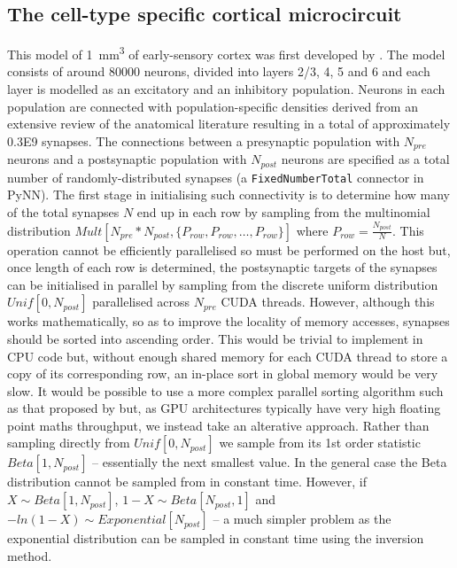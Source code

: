\documentclass[utf8]{frontiersSCNS} %
\begin{document}
\subsection{The cell-type specific cortical microcircuit}
\label{sec:method/microcircuit}
This model of \SI{1}{\milli\metre\cubed} of early-sensory cortex was first developed by \citet{Potjans2012}.
The model consists of around \num{80000} neurons, divided into layers 2/3, 4, 5 and 6 and each layer is modelled as an excitatory and an inhibitory population.
Neurons in each population are connected with population-specific densities derived from an extensive review of the anatomical literature resulting in a total of approximately \num{0.3E9} synapses.
The connections between a presynaptic population with $N_{pre}$ neurons and a postsynaptic population with $N_{post}$ neurons are specified as a total number of randomly-distributed synapses (a \lstinline{FixedNumberTotal} connector in PyNN).
The first stage in initialising such connectivity is to determine how many of the total synapses $N$ end up in each row by sampling from the multinomial distribution $Mult[N_{pre} * N_{post}, \{P_{row}, P_{row}, \ldots, P_{row}\}]$ where $P_{row} = \frac{N_{post}}{N}$.
This operation cannot be efficiently parallelised so must be performed on the host but, once length of each row is determined, the postsynaptic targets of the synapses can be initialised in parallel by sampling from the discrete uniform distribution $Unif[0, N_{post}]$ parallelised across $N_{pre}$ CUDA threads.
However, although this works mathematically, so as to improve the locality of memory accesses, synapses should be sorted into ascending order.
This would be trivial to implement in CPU code but, without enough shared memory for each CUDA thread to store a copy of its corresponding row, an in-place sort in global memory would be very slow.
It would be possible to use a more complex parallel sorting algorithm such as that proposed by \citet{Awan2016} but, as GPU architectures typically have very high floating point maths throughput, we instead take an alterative approach.
Rather than sampling directly from $Unif[0, N_{post}]$ we sample from its 1st order statistic $Beta[1, N_{post}]$ -- essentially the next smallest value.
In the general case the Beta distribution cannot be sampled from in constant time.
However, if $X \sim Beta[1, N_{post}]$, $1 - X \sim Beta[N_{post}, 1]$ and $-ln(1 - X) \sim Exponential[N_{post}]$ -- a much simpler problem as the exponential distribution can be sampled in constant time using the inversion method.
\end{document}
